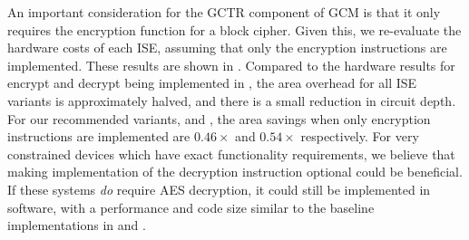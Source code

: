 An important consideration for the GCTR component of GCM is that it only
requires the encryption function for a block cipher.
Given this, we re-evaluate the hardware costs of each ISE, assuming that
only the encryption instructions are implemented.
These results are shown in .
Compared to the hardware results for encrypt and decrypt being implemented in
, the area overhead for all ISE variants
is approximately halved, and there is a small reduction in circuit depth.
For our recommended variants,  and ,
the area savings when only encryption instructions are implemented
are $0.46\times$ and $0.54\times$ respectively.
For very constrained devices which have exact functionality
requirements, we believe that making implementation of the decryption
instruction optional could be beneficial.
If these systems {\em do} require AES decryption, it could still be
implemented in software, with a performance and code size similar
to the baseline implementations in
and
.

